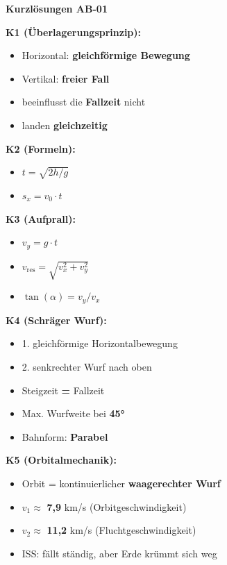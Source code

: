 \documentclass[10pt, a4paper]{article}
\newcommand{\fachfarbe}{physik}
\newcommand{\abschnitt}[1]{%
    \vspace{8pt}
    \noindent\textbf{\textcolor{\fachfarbe}{#1}}
    \vspace{4pt}
}
\begin{document}
\vspace{8pt}


\abschnitt{Kurzlösungen AB-01}

\begin{loesungbox}
\small
\textbf{K1 (Überlagerungsprinzip):}
\begin{itemize}[nosep]
    \item Horizontal: \textbf{gleichförmige Bewegung}
    \item Vertikal: \textbf{freier Fall}
    \item beeinflusst die \textbf{Fallzeit} nicht
    \item landen \textbf{gleichzeitig}
\end{itemize}

\vspace{4pt}
\textbf{K2 (Formeln):}
\begin{itemize}[nosep]
    \item $t = \sqrt{2h/g}$
    \item $s_x = v_0 \cdot t$
\end{itemize}

\vspace{4pt}
\textbf{K3 (Aufprall):}
\begin{itemize}[nosep]
    \item $v_y = g \cdot t$
    \item $v_{\text{res}} = \sqrt{v_x^2 + v_y^2}$
    \item $\tan(\alpha) = v_y / v_x$
\end{itemize}

\vspace{4pt}
\textbf{K4 (Schräger Wurf):}
\begin{itemize}[nosep]
    \item 1. gleichförmige Horizontalbewegung
    \item 2. senkrechter Wurf nach oben
    \item Steigzeit \textbf{=} Fallzeit
    \item Max. Wurfweite bei \textbf{45°}
    \item Bahnform: \textbf{Parabel}
\end{itemize}

\vspace{4pt}
\textbf{K5 (Orbitalmechanik):}
\begin{itemize}[nosep]
    \item Orbit = kontinuierlicher \textbf{waagerechter Wurf}
    \item $v_1 \approx$ \textbf{7,9} km/s (Orbitgeschwindigkeit)
    \item $v_2 \approx$ \textbf{11,2} km/s (Fluchtgeschwindigkeit)
    \item ISS: fällt ständig, aber Erde krümmt sich weg
\end{itemize}
\end{loesungbox}
\end{document}
